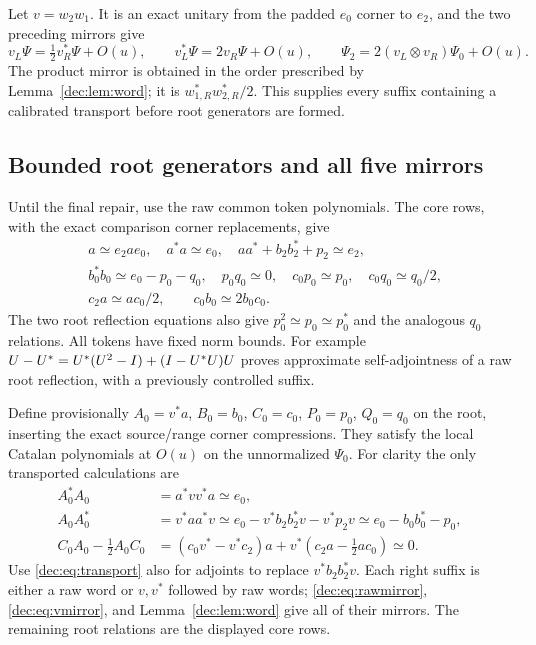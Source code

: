Let $v=w_2w_1$. It is an exact unitary from the padded $e_0$ corner to $e_2$, and the two preceding mirrors give
\begin{equation}\label{dec:eq:vmirror}
v_L\Psi=\tfrac12v_R^*\Psi+O(u),\qquad
v_L^*\Psi=2v_R\Psi+O(u),\qquad
\Psi_2=2(v_L\otimes v_R)\Psi_0+O(u).
\end{equation}
The product mirror is obtained in the order prescribed by Lemma~\ref{dec:lem:word}; it is $w_{1,R}^*w_{2,R}^*/2$. This supplies every suffix containing a calibrated transport before root generators are formed.

\subsection{Bounded root generators and all five mirrors}\label{dec:sec:root}
Until the final repair, use the raw common token polynomials. The core rows, with the exact comparison corner replacements, give
\begin{align*}
&a\simeq e_2ae_0,\quad a^*a\simeq e_0,
\quad aa^*+b_2b_2^*+p_2\simeq e_2,\\
&b_0^*b_0\simeq e_0-p_0-q_0,\quad p_0q_0\simeq0,
\quad c_0p_0\simeq p_0,\quad c_0q_0\simeq q_0/2,\\
&c_2a\simeq ac_0/2,\qquad c_0b_0\simeq2b_0c_0.
\end{align*}
The two root reflection equations also give $p_0^2\simeq p_0\simeq p_0^*$ and the analogous $q_0$ relations. All tokens have fixed norm bounds. For example $U-U^*=U^*(U^2-I)+(I-U^*U)U$ proves approximate self-adjointness of a raw root reflection, with a previously controlled suffix.

Define provisionally $A_0=v^*a$, $B_0=b_0$, $C_0=c_0$, $P_0=p_0$, $Q_0=q_0$ on the root, inserting the exact source/range corner compressions. They satisfy the local Catalan polynomials at $O(u)$ on the unnormalized $\Psi_0$. For clarity the only transported calculations are
\begin{align*}
A_0^*A_0&=a^*vv^*a\simeq e_0,\\
A_0A_0^*&=v^*aa^*v\simeq e_0-v^*b_2b_2^*v-v^*p_2v
\simeq e_0-b_0b_0^*-p_0,\\
C_0A_0-\tfrac12A_0C_0
&=(c_0v^*-v^*c_2)a+v^*(c_2a-\tfrac12ac_0)\simeq0.
\end{align*}
Use \eqref{dec:eq:transport} also for adjoints to replace $v^*b_2b_2^*v$. Each right suffix is either a raw word or $v,v^*$ followed by raw words; \eqref{dec:eq:rawmirror}, \eqref{dec:eq:vmirror}, and Lemma~\ref{dec:lem:word} give all of their mirrors. The remaining root relations are the displayed core rows.

